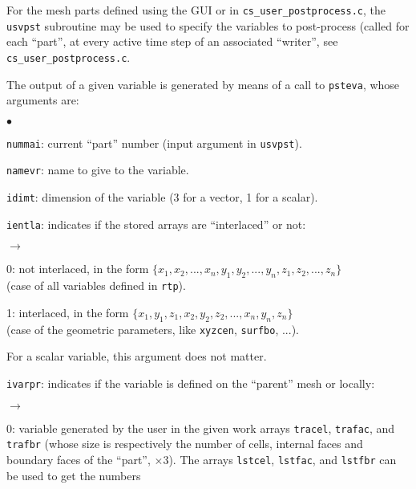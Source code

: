 {{{For the mesh parts defined using the GUI or in \texttt{cs\_user\_postprocess.c},
the \texttt{usvpst} subroutine  may be used to specify the variables to
post-process (called for each ``part'', at every active time step of an
associated ``writer'', see \texttt{cs\_user\_postprocess.c}.

The output of a given variable is generated by means of a call to
\texttt{psteva}, whose arguments are:

\begin{list}{$\bullet$}{}
       \item \texttt{nummai}: current ``part'' number (input
             argument in \texttt{usvpst}).
       \item \texttt{namevr}: name to give to the variable.
       \item \texttt{idimt}: dimension of the variable (3 for a vector, 1 for
             a scalar).
       \item \texttt{ientla}: indicates if the stored arrays are
             ``interlaced'' or not:
        \begin{list}{$\rightarrow$}{}
               \item 0: not interlaced, in the form ${\{x_1, x_2, ..., x_n,
                         y_1, y_2, ..., y_n, z_1, z_2, ..., z_n\}}$ \\
                         (case of all variables defined in \texttt{rtp}).
               \item 1: interlaced, in the form ${\{x_1, y_1, z_1, x_2, y_2, z_2, ..., x_n, y_n, z_n\}}$ \\
                         (case of the geometric parameters, like
                     \texttt{xyzcen}, \texttt{surfbo}, ...).
         \end{list}
              For a scalar variable, this argument does not matter.
       \item \texttt{ivarpr}: indicates if the variable is defined on the
             ``parent'' mesh or locally:
        \begin{list}{$\rightarrow$}{}
               \item 0: variable generated by the user in the given work
                     arrays \texttt{tracel}, \texttt{trafac}, and
                     \texttt{trafbr} (whose size is respectively the
                     number of cells, internal faces and boundary faces
                     of the ``part'', $\times 3$). The arrays
                     \texttt{lstcel}, \texttt{lstfac}, and
                     \texttt{lstfbr} can be used to get the numbers

\end{list}
\end{list}}}}
